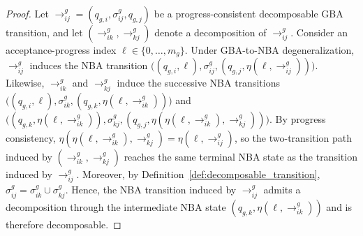 \documentclass[lettersize,journal]{IEEEtran}
\theoremstyle{italiclemma}
\theoremstyle{italiclemma}
\theoremstyle{definition}
\begin{document}
\begin{proof} \label{l2}
Let $\rightarrow^g_{ij}=(q_{g,i},\sigma^g_{ij},q_{g,j})$ be a progress-consistent decomposable GBA transition, and let $(\rightarrow^g_{ik},\rightarrow^g_{kj})$ denote a decomposition of $\rightarrow^g_{ij}$. Consider an acceptance-progress index $\ell\in\{0,\ldots,m_g\}$. Under GBA-to-NBA degeneralization, $\rightarrow^g_{ij}$ induces the NBA transition $\bigl((q_{g,i},\ell),\sigma^g_{ij},
(q_{g,j},\eta(\ell,\rightarrow^g_{ij}))\bigr).$ Likewise, $\rightarrow^g_{ik}$ and $\rightarrow^g_{kj}$ induce the
successive NBA transitions $\bigl((q_{g,i},\ell),\sigma^g_{ik}, (q_{g,k},\eta(\ell,\rightarrow^g_{ik}))\bigr)$ and $\bigl((q_{g,k},\eta(\ell,\rightarrow^g_{ik})),\sigma^g_{kj}, (q_{g,j}, \eta(\eta(\ell,\rightarrow^g_{ik}),\rightarrow^g_{kj}))\bigr).$  By progress consistency, $\eta(\eta(\ell,\rightarrow^g_{ik}),\rightarrow^g_{kj})
= \eta(\ell,\rightarrow^g_{ij})$, so the two-transition path induced by $(\rightarrow^g_{ik},\rightarrow^g_{kj})$ reaches the same terminal NBA state as the transition induced by $\rightarrow^g_{ij}$. Moreover, by Definition~\ref{def:decomposable_transition}, $\sigma^g_{ij} = \sigma^g_{ik}\cup\sigma^g_{kj}.$ Hence, the NBA transition induced by $\rightarrow^g_{ij}$ admits a
decomposition through the intermediate NBA state
$(q_{g,k},\eta(\ell,\rightarrow^g_{ik}))$ and is therefore decomposable. 

\end{proof}
\end{document}
